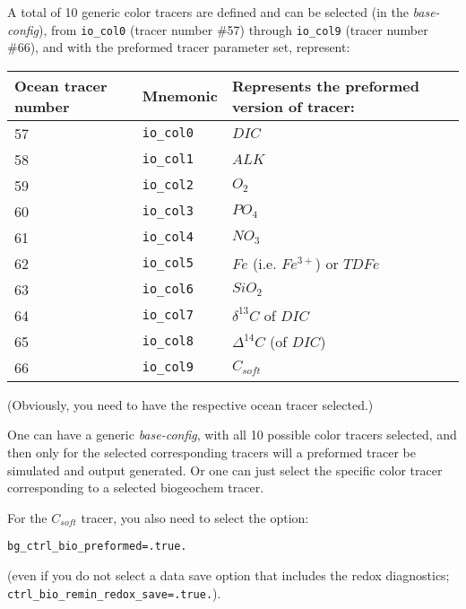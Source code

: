 \documentclass[11pt,fleqn]{book} %
\begin{document}
A total of 10 generic color tracers are defined and can be selected (in the \textit{base-config}), from \texttt{io\_col0} (tracer number \#57) through \texttt{io\_col9} (tracer number \#66), and with the preformed tracer parameter set, represent:

\begin{table}[ht]
\begin{tabular}{l l l} %
\hline\hline %
Ocean tracer number & Mnemonic & Represents the preformed version of tracer: \\ [0.5ex] %
\hline %
57 & \texttt{io\_col0} & \(DIC\) \\
58 & \texttt{io\_col1} & \(ALK\) \\
59 & \texttt{io\_col2} & \(O_{2}\) \\
60 & \texttt{io\_col3} & \(PO_{4}\) \\
61 & \texttt{io\_col4} & \(NO_{3}\) \\
62 & \texttt{io\_col5} & \(Fe\) (i.e. \(Fe^{3+}\)) or \(TDFe\) \\
63 & \texttt{io\_col6} & \(SiO_{2}\) \\
64 & \texttt{io\_col7} & \(\delta^{13}C\) of \(DIC\) \\
65 & \texttt{io\_col8} & \(\Delta^{14}C\) (of \(DIC\)) \\
66 & \texttt{io\_col9} & \(C_{soft}\) \\
[1pt] %
\hline %
\end{tabular}
\label{table:nonlin} %
\end{table}

\noindent (Obviously, you need to have the respective ocean tracer selected.)

One can have a generic \textit{base-config}, with all 10 possible color tracers selected, and then only for the selected corresponding tracers will a preformed tracer be simulated and output generated. Or one can just select the specific color tracer corresponding to a selected biogeochem tracer.

For the \(C_{soft}\) tracer, you also need to select the option:

\texttt{bg\_ctrl\_bio\_preformed=.true.}

\noindent (even if you do not select a data save option that includes the redox diagnostics; \linebreak \texttt{ctrl\_bio\_remin\_redox\_save=.true.}).
\end{document}
